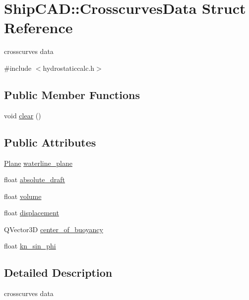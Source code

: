 \hypertarget{structShipCAD_1_1CrosscurvesData}{}\section{Ship\+C\+AD\+:\+:Crosscurves\+Data Struct Reference}
\label{structShipCAD_1_1CrosscurvesData}


crosscurves data  




{\ttfamily \#include $<$hydrostaticcalc.\+h$>$}

\subsection*{Public Member Functions}
\begin{DoxyCompactItemize}
\item 
void \hyperlink{structShipCAD_1_1CrosscurvesData_a2fcb82c940ad6a13c07a25f44bbd5efd}{clear} ()
\end{DoxyCompactItemize}
\subsection*{Public Attributes}
\begin{DoxyCompactItemize}
\item 
\hyperlink{classShipCAD_1_1Plane}{Plane} \hyperlink{structShipCAD_1_1CrosscurvesData_a1ea6de1b52289e8392e8d499ae4aad04}{waterline\+\_\+plane}
\item 
float \hyperlink{structShipCAD_1_1CrosscurvesData_a759e5729cdb86d8367b139e66fecb7d3}{absolute\+\_\+draft}
\item 
float \hyperlink{structShipCAD_1_1CrosscurvesData_a9bec38a77bf87ab5feb76899e39e4f7b}{volume}
\item 
float \hyperlink{structShipCAD_1_1CrosscurvesData_a9a7baa66159e203888390eaa63caf708}{displacement}
\item 
Q\+Vector3D \hyperlink{structShipCAD_1_1CrosscurvesData_a0de723cd5ae0e18953fb7ad5a0f5dadf}{center\+\_\+of\+\_\+buoyancy}
\item 
float \hyperlink{structShipCAD_1_1CrosscurvesData_a55150860fed821e314e18b72f1975749}{kn\+\_\+sin\+\_\+phi}
\end{DoxyCompactItemize}


\subsection{Detailed Description}
crosscurves data 


